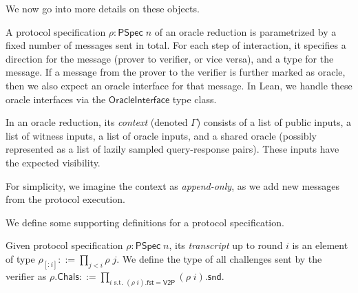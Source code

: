We now go into more details on these objects.

\begin{definition}
    \label{def:oracle_reduction_type_signature}
    A protocol specification $\rho : \mathsf{PSpec}\; n$ of an oracle reduction is parametrized by a fixed number of messages sent in total. For each step of interaction, it specifies a direction for the message (prover to verifier, or vice versa), and a type for the message. If a message from the prover to the verifier is further marked as oracle, then we also expect an oracle interface for that message. In Lean, we handle these oracle interfaces via the $\mathsf{OracleInterface}$ type class.
\end{definition}

\begin{definition}[Context]\label{def:context}
    In an oracle reduction, its \emph{context} (denoted $\Gamma$) consists of a list of public inputs, a list of witness inputs, a list of oracle inputs, and a shared oracle (possibly represented as a list of lazily sampled query-response pairs). These inputs have the expected visibility.

For simplicity, we imagine the context as \emph{append-only}, as we add new messages from the protocol execution.
\end{definition}

We define some supporting definitions for a protocol specification.

\begin{definition}
    \label{def:transcript_and_related_defs}
    Given protocol specification $\rho : \mathsf{PSpec}\; n$, its \emph{transcript} up to round $i$ is an element of type $\rho_{[:i]} ::= \prod_{j < i} \rho\; j$. We define the type of all challenges sent by the verifier as $\rho.\mathsf{Chals} ::= \prod_{i \text{ s.t. } (\rho\; i).\mathsf{fst} = \mathsf{V2P}} (\rho\; i).\mathsf{snd}$.
\end{definition}


